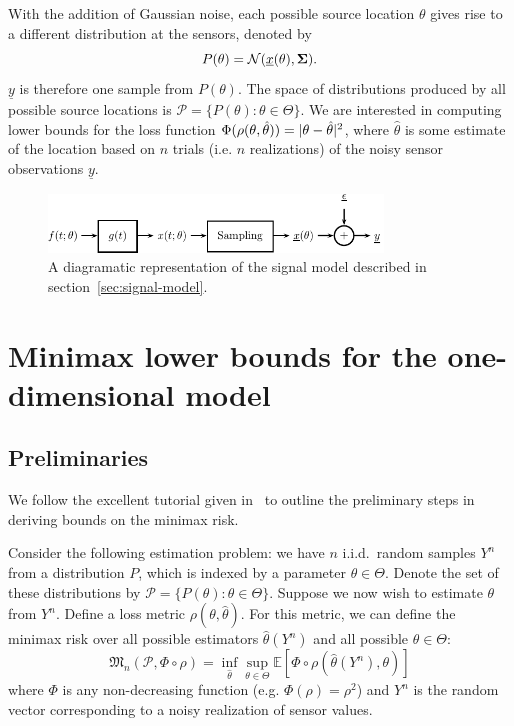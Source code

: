 \documentclass[conference]{IEEEtran}
\providecommand{\v}{}
\renewcommand{\v}[1]{\underline{#1}}
\providecommand{\m}{}
\renewcommand{\m}[1]{{\bf #1}}
\DeclarePairedDelimiter\abs{\lvert}{\rvert}
\newcommand{\Phiorho}{\Phi\!\circ\!\rho}
\begin{document}
With the addition of Gaussian noise, each possible source location $\theta$
gives rise to a different distribution at the sensors, denoted by
\begin{equation} \label{eq:p-theta}
	P(\theta) = \mathcal{N}(\v x(\theta), \m \Sigma).
\end{equation}
$\v y$ is therefore one sample from $P(\theta)$. The space of distributions
produced by all possible source locations is $\mathcal{P} = \{P(\theta) :
\theta \in \Theta \}$. We are interested in computing lower bounds for the loss
function $\Phi(\rho(\theta, \hat\theta)) = \abs{\theta - \hat\theta}^2$, where
$\hat\theta$ is some estimate of the location based on $n$ trials (i.e. $n$
realizations) of the noisy sensor observations $\v y$.

\begin{figure}[tp] %
	\centering
	\includegraphics[width=3.5in]{block-diagram}
	\caption{A diagramatic representation of the signal model described in
	section~\ref{sec:signal-model}.}
	\label{fig:signal-model}
\end{figure}

\section{Minimax lower bounds for the one-dimensional model}

\subsection{Preliminaries}

We follow the excellent tutorial given in~\cite{Duchi2015Information} to
outline the preliminary steps in deriving bounds on the minimax risk.

Consider the following estimation problem: we have $n$ i.i.d.\ random samples
$Y^n$ from a distribution $P$, which is indexed by a parameter $\theta \in
\Theta$.  Denote the set of these distributions by $\mathcal{P} = \{P(\theta) :
\theta \in \Theta\}$. Suppose we now wish to estimate $\theta$ from $Y^n$.
Define a loss metric $\rho(\theta, \hat\theta)$. For this metric, we can define
the minimax risk over all possible estimators $\hat\theta(Y^n)$ and all
possible $\theta \in \Theta$:
\begin{equation} \label{eq:minimax-expr}
	\mathfrak{M}_n(\mathcal{P}, \Phiorho) = \inf_{\hat\theta} \sup_{\theta \in \Theta} \mathbb E[\Phiorho (\hat\theta(Y^n), \theta)]
\end{equation}
where $\Phi$ is any non-decreasing function (e.g. $\Phi(\rho) = \rho^2$) and
$Y^n$ is the random vector corresponding to a noisy realization of sensor
values.
\end{document}
